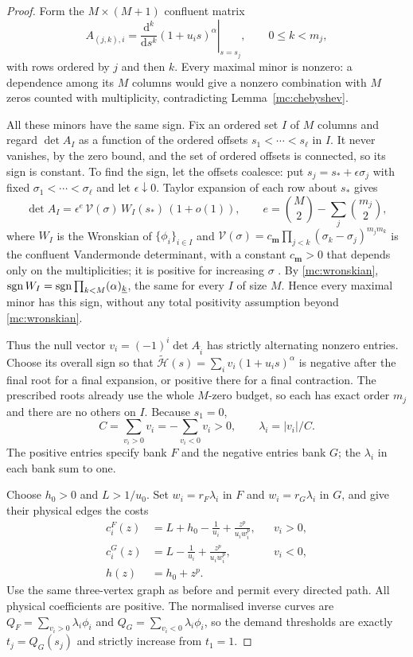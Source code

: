 \begin{proof}
Form the $M\times(M+1)$ confluent matrix
\begin{equation}\label{mc:matrix}
 A_{(j,k),i}=\left.\frac{\mathrm d^k}{\mathrm ds^k}(1+u_is)^\alpha\right|_{s=s_j},
 \qquad 0\le k<m_j,
\end{equation}
with rows ordered by $j$ and then $k$. Every maximal minor is nonzero: a dependence among its $M$ columns would give a nonzero combination with $M$ zeros counted with multiplicity, contradicting Lemma~\ref{mc:chebyshev}.

All these minors have the same sign. Fix an ordered set $I$ of $M$ columns and regard $\det A_I$ as a function of the ordered offsets $s_1<\cdots<s_\ell$ in $I$. It never vanishes, by the zero bound, and the set of ordered offsets is connected, so its sign is constant. To find the sign, let the offsets coalesce: put $s_j=s_*+\epsilon\sigma_j$ with fixed $\sigma_1<\cdots<\sigma_\ell$ and let $\epsilon\downarrow0$. Taylor expansion of each row about $s_*$ gives
\[
 \det A_I=\epsilon^{e}\,\mathcal V(\sigma)\,W_I(s_*)\,(1+o(1)),\qquad e=\binom M2-\sum_j\binom{m_j}2,
\]
where $W_I$ is the Wronskian of $\{\phi_i\}_{i\in I}$ and $\mathcal V(\sigma)=c_{\mathbf m}\prod_{j<k}(\sigma_k-\sigma_j)^{m_jm_k}$ is the confluent Vandermonde determinant, with a constant $c_{\mathbf m}>0$ that depends only on the multiplicities; it is positive for increasing $\sigma$ \cite[Ch.~2]{Karlin1968}. By \eqref{mc:wronskian}, $\operatorname{sgn} W_I=\operatorname{sgn}\prod_{k<M}(\alpha)_{\underline k}$, the same for every $I$ of size $M$. Hence every maximal minor has this sign, without any total positivity assumption beyond \eqref{mc:wronskian}.

Thus the null vector $v_i=(-1)^i\det A_{\widehat i}$ has strictly alternating nonzero entries. Choose its overall sign so that $\widetilde{\mathcal H}(s)=\sum_i v_i(1+u_is)^\alpha$ is negative after the final root for a final expansion, or positive there for a final contraction. The prescribed roots already use the whole $M$-zero budget, so each has exact order $m_j$ and there are no others on $I$. Because $s_1=0$,
\begin{equation}\label{mc:weights}
 C=\sum_{v_i>0}v_i=-\sum_{v_i<0}v_i>0,\qquad
 \lambda_i=|v_i|/C.
\end{equation}
The positive entries specify bank $F$ and the negative entries bank $G$; the $\lambda_i$ in each bank sum to one.

Choose $h_0>0$ and $L>1/u_0$. Set $w_i=r_F\lambda_i$ in $F$ and $w_i=r_G\lambda_i$ in $G$, and give their physical edges the costs
\begin{align}\label{mc:physical}
 c_i^F(z)&=L+h_0-\frac1{u_i}+\frac{z^p}{u_iw_i^p},&&v_i>0,\nonumber\\
 c_i^G(z)&=L-\frac1{u_i}+\frac{z^p}{u_iw_i^p},&&v_i<0,\\
 h(z)&=h_0+z^p.\nonumber
\end{align}
Use the same three-vertex graph as before and permit every directed path. All physical coefficients are positive. The normalised inverse curves are $Q_F=\sum_{v_i>0}\lambda_i\phi_i$ and $Q_G=\sum_{v_i<0}\lambda_i\phi_i$, so the demand thresholds are exactly $t_j=Q_G(s_j)$ and strictly increase from $t_1=1$.


\end{proof}
